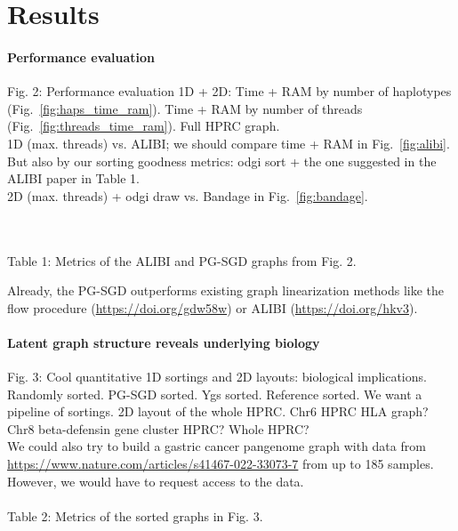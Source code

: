 \documentclass{bioinfo}
\theoremstyle{definition}
\begin{document}
    
    \fi

    \iffalse


    \section{Results}
    \label{sec:results}




    \paragraph{Performance evaluation}
    Fig. 2: Performance evaluation 1D + 2D: Time + RAM by number of haplotypes (Fig.~\ref{fig:haps_time_ram}). Time + RAM by number of threads (Fig.~\ref{fig:threads_time_ram}). Full HPRC graph.
    \\
    1D (max. threads) vs. ALIBI; we should compare time + RAM in Fig.~\ref{fig:alibi}.
    But also by our sorting goodness metrics: odgi sort + the one suggested in the ALIBI paper in Table 1.
    \\
    2D (max. threads) + odgi draw vs. Bandage in Fig.~\ref{fig:bandage}.
    
    \\
    \\
    Table 1: Metrics of the ALIBI and PG-SGD graphs from Fig. 2.
    
    Already, the PG-SGD outperforms existing graph linearization methods like the flow procedure (\url{https://doi.org/gdw58w}) or ALIBI (\url{https://doi.org/hkv3}).

    \paragraph{Latent graph structure reveals underlying biology}
    Fig. 3: Cool quantitative 1D sortings and 2D layouts: biological implications.
    Randomly sorted. PG-SGD sorted. Ygs sorted. Reference sorted.
    We want a pipeline of sortings. 2D layout of the whole HPRC.
    Chr6 HPRC HLA graph? Chr8 beta-defensin gene cluster HPRC? Whole HPRC?
    \\
    We could also try to build a gastric cancer pangenome graph with data from \url{https://www.nature.com/articles/s41467-022-33073-7} from up to 185 samples.
    However, we would have to request access to the data.
    \\
    \\
    
    Table 2: Metrics of the sorted graphs in Fig. 3.
    
\end{document}
